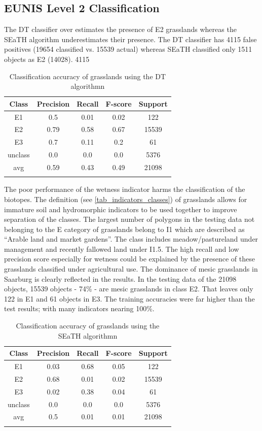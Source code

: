 \documentclass[authoryear, review,12pt,number]{elsarticle}
\begin{document}
{\subsection{EUNIS Level 2 Classification}
\label{level2_classification}
The DT classifier over estimates the presence of E2 grasslands whereas
the SEaTH algorithm underestimates their presence. The DT classifier has 4115
false positives (19654 classified vs. 15539 actual) whereas SEaTH classified
only 1511 objects as E2 (14028). 
4115 
\begin{table}
\begin{tabular}{c c c c c}
Class & Precision & Recall & F-score & Support\\
\hline
E1 & 0.5 & 0.01 & 0.02 & 122\\
E2 & 0.79 & 0.58 & 0.67 & 15539\\
E3 & 0.7 & 0.11 & 0.2 & 61\\
unclass & 0.0 & 0.0 & 0.0 & 5376\\
avg & 0.59 & 0.43 & 0.49 & 21098\\
\label{fig:dt_lvl2_classification}
\end{tabular}
\caption{Classification accuracy of grasslands using the DT algorithmn}
\end{table}

The poor performance of the wetness indicator harms the classification of the
biotopes. The definition (see \ref{tab_indicators_classes}) of grasslands allows
for immature soil and hydromorphic indicators to be used together to improve
separation of the classes.
The largest number of polygons in the testing data not belonging to the E
category of grasslands belong to I1 which are described as ``Arable land and
market gardens''. The class includes meadow/pastureland under management and
recently fallowed land under I1.5. The high recall and low precision score
especially for wetness could be explained by the presence of these grasslands
classified under agricultural use.
The dominance of mesic grasslands in Saarburg is clearly reflected in
the results. In the testing data of the 21098 objects, 15539 objects - 74\% - are mesic grasslands
in class E2. That leaves only 122 in E1 and 61 objects in E3. The training
accuracies were far higher than the test results; with many indicators nearing
100\%.  



\begin{table}
\begin{tabular}{c c c c c}
Class & Precision & Recall & F-score & Support\\
\hline
E1 & 0.03 & 0.68 & 0.05 & 122\\
E2 & 0.68 & 0.01 & 0.02 & 15539\\
E3 & 0.02 & 0.38 & 0.04 & 61\\
unclass & 0.0 & 0.0 & 0.0 & 5376\\
avg & 0.5 & 0.01 & 0.01 & 21098\\
\label{fig:seath_lvl2_classification}
\end{tabular}
\caption{Classification accuracy of grasslands using the SEaTH algorithmn}
\end{table}

}
\end{document}
